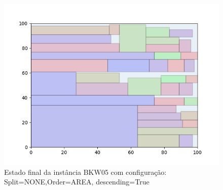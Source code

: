 \begin{figure}[H]
    \centering
    \caption[]{Estado final da instância BKW05 com configuração: Split=NONE,Order=AREA, descending=True}
    \label{fig:bkw05-none-area-true}
    \includegraphics[scale=0.5]{output/figures/bkw/bkw05/none/area/true/00}
\end{figure}
